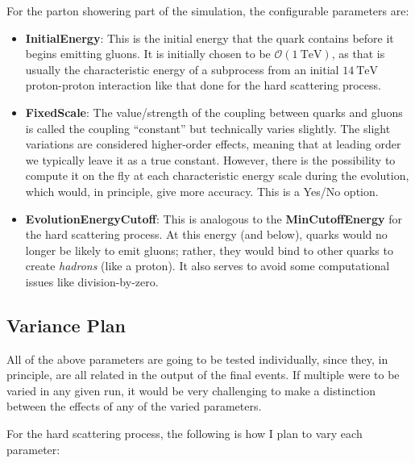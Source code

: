 For the parton showering part of the simulation, the configurable parameters are:

\begin{itemize}
\item \textbf{InitialEnergy}: This is the initial energy that the quark contains before it begins emitting gluons. It is initially chosen to be $\mathcal{O}(\qty{1}{\tera\electronvolt})$, as that is usually the characteristic energy of a subprocess from an initial $\qty{14}{\tera\electronvolt}$ proton-proton interaction like that done for the hard scattering process.
\item \textbf{FixedScale}: The value/strength of the coupling between quarks and gluons is called the coupling ``constant'' but technically varies slightly. The slight variations are considered higher-order effects, meaning that at leading order we typically leave it as a true constant. However, there is the possibility to compute it on the fly at each characteristic energy scale during the evolution, which would, in principle, give more accuracy. This is a Yes/No option.
\item \textbf{EvolutionEnergyCutoff}: This is analogous to the \textbf{MinCutoffEnergy} for the hard scattering process. At this energy (and below), quarks would no longer be likely to emit gluons; rather, they would bind to other quarks to create \textit{hadrons} (like a proton). It also serves to avoid some computational issues like division-by-zero.
\end{itemize}




\subsection{Variance Plan}

All of the above parameters are going to be tested individually, since they, in principle, are all related in the output of the final events. If multiple were to be varied in any given run, it would be very challenging to make a distinction between the effects of any of the varied parameters.

For the hard scattering process, the following is how I plan to vary each parameter:

